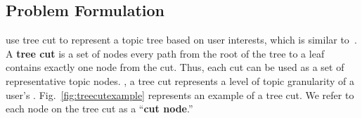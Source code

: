 
\subsection{Problem Formulation}

 use  tree cut to represent a topic tree based on user interests, which is similar to~\cite{cui2014}.
A \textbf{\normalsize tree cut} is a set of nodes  every path from the root of the tree to a leaf contains exactly one node from the cut.
Thus, each cut can be used as a set of representative topic nodes.
, a tree cut represents a level of topic granularity of a user's .
Fig.~\ref{fig:treecutexample} represents an example of a tree cut.
We refer to each node on the tree cut as a ``\textbf{\normalsize cut node}.''



